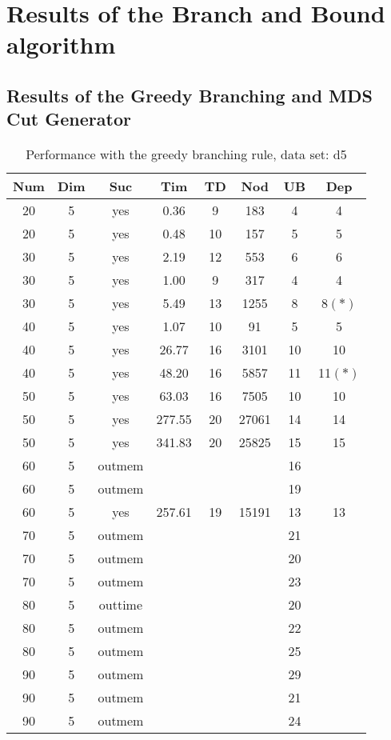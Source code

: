 \section{Results of the Branch and Bound algorithm}
\label{sec:apd.bac}

\subsection{Results of the Greedy Branching and MDS Cut Generator}
\label{sec:apd.bac.gre}

\begin{table}[!htb]
  \centering
  \begin{tabular}[center]{|c|c|c|c|c|c|c|c|}
    \hline
    Num & Dim & Suc & Tim & TD & Nod & UB & Dep \\
    \hline
    20 & 5 & yes & 0.36 & 9 & 183 & 4 & 4 \\
    20 & 5 & yes & 0.48 & 10 & 157 & 5 & 5 \\
    30 & 5 & yes & 2.19 & 12 & 553 & 6 & 6 \\
    30 & 5 & yes & 1.00 & 9 & 317 & 4 & 4 \\
    30 & 5 & yes & 5.49 & 13 & 1255 & 8 & 8$(*)$ \\
    40 & 5 & yes & 1.07 & 10 & 91 & 5 & 5 \\
    40 & 5 & yes & 26.77 & 16 & 3101 & 10 & 10 \\
    40 & 5 & yes & 48.20 & 16 & 5857 & 11 & 11$(*)$ \\
    50 & 5 & yes & 63.03 & 16 & 7505 & 10 & 10 \\
    50 & 5 & yes & 277.55 & 20 & 27061 & 14 & 14 \\
    50 & 5 & yes & 341.83 & 20 & 25825 & 15 & 15 \\
    60 & 5 & outmem &&&& 16 &\\
    60 & 5 & outmem &&&& 19 &\\
    60 & 5 & yes & 257.61 & 19 & 15191 & 13 & 13 \\
    70 & 5 & outmem &&&& 21 &\\
    70 & 5 & outmem &&&& 20 &\\
    70 & 5 & outmem &&&& 23 &\\
    80 & 5 & outtime &&&& 20 &\\
    80 & 5 & outmem &&&& 22 &\\
    80 & 5 & outmem &&&& 25 &\\
    90 & 5 & outmem &&&& 29 &\\
    90 & 5 & outmem &&&& 21 &\\
    90 & 5 & outmem &&&& 24 &\\
    \hline
  \end{tabular}
  \caption{Performance with the greedy branching rule, data set: d5}
  \label{tab:test.cutmds-d5}
\end{table}

